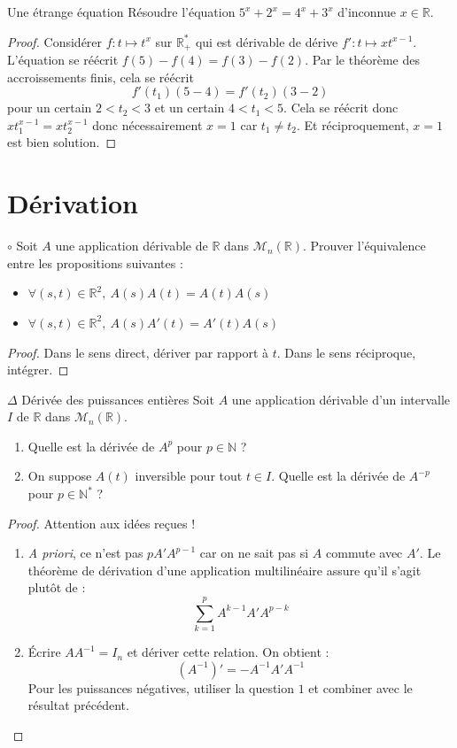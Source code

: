 \documentclass[french,a4paper]{article}
\newcommand{\N}{\mathbb{N}}
\newcommand{\R}{\mathbb{R}}
\newcommand{\st}{^*}
\newcommand{\inv}{^{-1}}
\theoremstyle{plain}
\theoremstyle{definition}
\theoremstyle{remark}
\begin{document}
\begin{ex}[?]{Une étrange équation}
	Résoudre l'équation $5^x+2^x=4^x+3^x$ d'inconnue $x\in\R$.
\end{ex}
\begin{proof}
	Considérer $f:t\mapsto t^x$ sur $\R_+\st$ qui est dérivable de dérive $f':t\mapsto xt^{x-1}$. L'équation se réécrit $f(5)-f(4)=f(3)-f(2)$. Par le théorème des accroissements finis, cela se réécrit $$f'(t_1)(5-4)=f'(t_2)(3-2)$$ pour un certain $2<t_2<3$ et un certain $4<t_1<5$. Cela se réécrit donc $xt_1^{x-1}=xt_2^{x-1}$ donc nécessairement $x=1$ car $t_1\ne t_2$. Et réciproquement, $x=1$ est bien solution.
\end{proof}

\section{Dérivation}

\begin{ex}[Moulin.FV.07]{$\circ$}
	Soit $A$ une application dérivable de $\R$ dans $\mathcal{M}_n(\R)$. Prouver l'équivalence entre les propositions suivantes :
	\begin{itemize}
		\item $\forall (s,t)\in\R^2,\ A(s)A(t)=A(t)A(s)$ 
		\item $\forall (s,t)\in\R^2,\ A(s)A'(t)=A'(t)A(s)$
	\end{itemize}
\end{ex}
\begin{proof}
	Dans le sens direct, dériver par rapport à $t$. Dans le sens réciproque, intégrer.
\end{proof}

\begin{ex}[Moulin.FV.08]{$\Delta$ Dérivée des puissances entières}
	Soit $A$ une application dérivable d'un intervalle $I$ de $\R$ dans $\mathcal{M}_n(\R)$.
	\begin{enumerate}
		\item Quelle est la dérivée de $A^p$ pour $p\in\N$ ?
		\item On suppose $A(t)$ inversible pour tout $t\in I$. Quelle est la dérivée de $A^{-p}$ pour $p\in\N\st$ ?
	\end{enumerate}
\end{ex}
\begin{proof}
	Attention aux idées reçues !
	\begin{enumerate}
		\item \textit{A priori}, ce n'est pas $pA'A^{p-1}$ car on ne sait pas si $A$ commute avec $A'$. Le théorème de dérivation d'une application multilinéaire assure qu'il s'agit plutôt de : $$\sum_{k=1}^pA^{k-1}A'A^{p-k}$$
		\item Écrire $AA\inv=I_n$ et dériver cette relation. On obtient : $$(A\inv)'=-A\inv A' A\inv$$ Pour les puissances négatives, utiliser la question $1$ et combiner avec le résultat précédent.
	\end{enumerate}
\end{proof}
\end{document}
